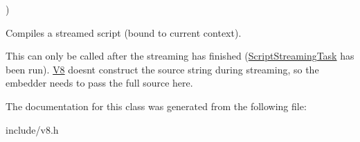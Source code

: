 {\begin{DoxyParamCaption}
\end{DoxyParamCaption}
)\hspace{0.3cm}{\ttfamily [static]}}\hypertarget{classv8_1_1_script_compiler_a60c0b0605f19607cce32e3eb776be13e}{}\label{classv8_1_1_script_compiler_a60c0b0605f19607cce32e3eb776be13e}
Compiles a streamed script (bound to current context).

This can only be called after the streaming has finished (\hyperlink{classv8_1_1_script_compiler_1_1_script_streaming_task}{Script\+Streaming\+Task} has been run). \hyperlink{classv8_1_1_v8}{V8} doesn\textquotesingle{}t construct the source string during streaming, so the embedder needs to pass the full source here. 

The documentation for this class was generated from the following file\+:\begin{DoxyCompactItemize}
\item 
include/v8.\+h\end{DoxyCompactItemize}
